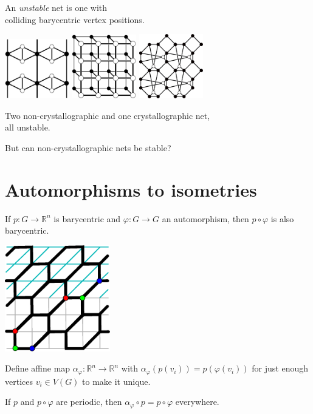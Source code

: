 \documentclass{beamer}
\begin{document}
\begin{frame}
  \begin{center}
    An {\em unstable} net is one with\\
    colliding barycentric vertex positions.

    \includegraphics[width=1.1in]{unstable}
    \quad
    \includegraphics[width=1.1in]{ladder}
    \quad
    \includegraphics[width=1.1in]{collision}

    Two non-crystallographic and one crystallographic net,\\
    all unstable.

    But can non-crystallographic nets be stable?
  \end{center}
\end{frame}


\section{Automorphisms to isometries}

\begin{frame}
  \begin{center}
    If $p\colon G \to \mathbb{R}^n$ is barycentric and $\varphi\colon G \to
    G$ an automorphism, then $p\circ\varphi$ is also barycentric.

    \includegraphics[width=1.8in]{affine}

    Define affine map $\alpha_\varphi\colon \mathbb{R}^n \to \mathbb{R}^n$ with
    $\alpha_\varphi(p(v_i)) = p(\varphi(v_i))$ for just enough vertices
    $v_i\in V(G)$ to make it unique.

    If $p$ and $p\circ\varphi$ are periodic, then $\alpha_\varphi\circ p =
    p\circ\varphi$ everywhere.
  \end{center}
\end{frame}
\end{document}
